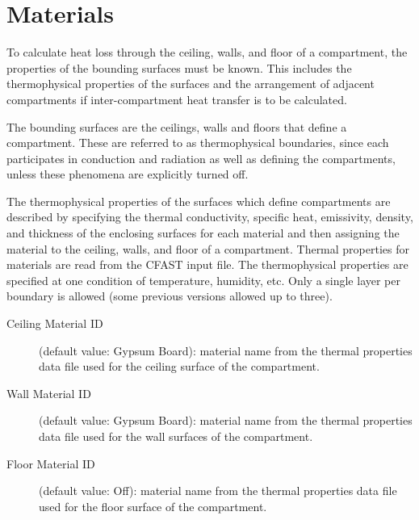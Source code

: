 \section{Materials}
\label{info:COMP2}
To calculate heat loss through the ceiling, walls, and floor of a compartment, the properties of the bounding surfaces must be known. This includes the thermophysical properties of the surfaces and the arrangement of adjacent compartments if inter-compartment heat transfer is to be calculated.

The bounding surfaces are the ceilings, walls and floors that define a compartment. These are referred to as thermophysical boundaries, since each participates in conduction and radiation as well as defining the compartments, unless these phenomena are explicitly turned off.

The thermophysical properties of the surfaces which define compartments are described by specifying the thermal conductivity, specific heat, emissivity, density, and thickness of the enclosing surfaces for each material and then assigning the material to the ceiling, walls, and floor of a compartment.  Thermal properties for materials are read from the CFAST input file.  The thermophysical properties are specified at one condition of temperature, humidity, etc.  Only a single layer per boundary is allowed (some previous versions allowed up to three).

\begin{description}
\item[Ceiling Material ID] (default value: Gypsum Board): material name from the thermal properties data file used for the ceiling surface of the compartment.

\item[Wall Material ID] (default value: Gypsum Board): material name from the thermal properties data file used for the wall surfaces of the compartment.

\item[Floor Material ID] (default value: Off): material name from the thermal properties data file used for the floor surface of the compartment.
\end{description}





